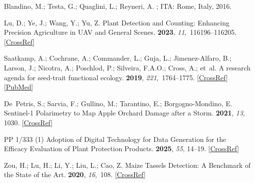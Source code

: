 \documentclass[12pt,a4paper,oneside]{report}
\begin{document}
\begin{thebibliography}{999}

Blandino, M.; Testa, G.; Quaglini, L.; Reyneri, A.
; ITA: Rome, Italy, 
2016.


Lu, D.; Ye, J.; Wang, Y.; Yu, Z.
\newblock Plant Detection and Counting: Enhancing Precision Agriculture in UAV
and General Scenes.
 {\bf 2023}, {\em 11},~116196--116205. [\href{http://doi.org/10.1109/ACCESS.2023.3325747}{CrossRef}]

Saatkamp, A.; Cochrane, A.; Commander, L.; Guja, L.; Jimenez-Alfaro, B.;
Larson, J.; Nicotra, A.; Poschlod, P.; Silveira, F.A.O.; Cross, A.;  et~al.
\newblock A research agenda for seed-trait functional ecology.
 {\bf 2019}, {\em 221},~1764--1775. [\href{http://dx.doi.org/10.1111/nph.15502}{CrossRef}] [\href{http://www.ncbi.nlm.nih.gov/pubmed/30269352}{PubMed}]

De~Petris, S.; Sarvia, F.; Gullino, M.; Tarantino, E.; Borgogno-Mondino, E.
\newblock Sentinel-1 Polarimetry to Map Apple Orchard Damage after a Storm.
 {\bf 2021}, {\em 13}, 1030. [\href{http://dx.doi.org/10.3390/rs13051030}{CrossRef}]

{{{\textsc{PP}}}} 1/333 (1) {{Adoption}} of Digital Technology for Data
Generation for the Efficacy Evaluation of Plant Protection Products.
 {\bf 2025}, {\em 55}, 14--19. [\href{http://dx.doi.org/10.1111/epp.13037}{CrossRef}]

Zou, H.; Lu, H.; Li, Y.; Liu, L.; Cao, Z.
\newblock Maize Tassels Detection: A Benchmark of the State of the Art.
 {\bf 2020}, {\em 16},~108. [\href{http://dx.doi.org/10.1186/s13007-020-00651-z}{CrossRef}]


\end{thebibliography}
\end{document}
